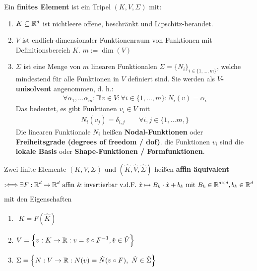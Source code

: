 \begin{definition}\enter %
Ein \textbf{finites Element} ist ein Tripel $(K,V,\Sigma)$ mit:
\begin{enumerate}[label=(\roman*)]
\item $K\subseteq\mathbb{R}^d$ ist nichtleere offene, beschränkt und Lipschitz-berandet.
\item $V$ ist endlich-dimensionaler Funktionenraum von Funktionen mit Definitionsbereich $K$. $m:=\dim(V)$
\item $\Sigma$ ist eine Menge von $m$ linearen Funktionalen $\Sigma=\lbrace N_i\rbrace_{i\in\lbrace1,\ldots,m\rbrace}$, welche mindestend für alle Funktionen in $V$ definiert sind. Sie werden als \textbf{$V$-unisolvent} angenommen, d. h.:
\begin{align*}
\forall \alpha_1,\ldots\alpha_m:\exists! v\in V:\forall i\in\lbrace1,\ldots,m\rbrace:N_i(v)=\alpha_i
\end{align*}
Das bedeutet, es gibt Funktionen $v_i\in V$ mit
\begin{align*}
N_i(v_j)=\delta_{i,j}\qquad\forall i,j\in\lbrace1,\ldots m,\rbrace
\end{align*}
Die linearen Funktionale $N_i$ heißen \textbf{Nodal-Funktionen} oder \textbf{Freiheitsgrade (degrees of freedom / dof)}. die Funktionen $v_i$ sind die \textbf{lokale Basis} oder \textbf{Shape-Funktionen / Formfunktionen}.
\end{enumerate}
\end{definition}

\begin{definition}\enter %
Zwei finite Elemente $(K,V,\Sigma)$ und $(\hat{K},\hat{V},\hat{\Sigma})$ heißen \textbf{affin äquivalent}
\begin{align*}
:\Longleftrightarrow\exists F:\mathbb{R}^d\to\mathbb{R}^d\text{ affin \& invertierbar v.d.F. }
\hat{x}\mapsto B_k\cdot\hat{x}+b_k\text{ mit } B_k\in\mathbb{R}^{d\times d},b_k\in\mathbb{R}^d
\end{align*}
mit den Eigenschaften
\begin{enumerate}[label=(\arabic*)]
\item $\begin{aligned}
K=F(\hat{K})
\end{aligned}$
\item $\begin{aligned}
V=\Big\lbrace v: K\to\mathbb{R}:v=\hat{v}\circ F^{-1},\hat{v}\in\hat{V}\Big\rbrace
\end{aligned}$
\item $\begin{aligned}
\Sigma=\Big\lbrace N:V\to\mathbb{R}:N(v)=\hat{N}(v\circ F),~\hat{N}\in\hat{\Sigma}\Big\rbrace
\end{aligned}$
\end{enumerate}
\end{definition}

